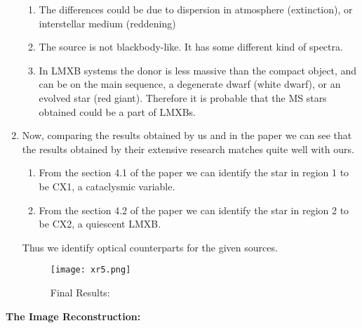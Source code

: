 \documentclass{article}
\begin{document}
\begin{enumerate}
\begin{enumerate}
        \item The differences could be due to dispersion in atmosphere (extinction), or interstellar medium (reddening)
        \item The source is not blackbody-like. It has some different kind of spectra.
        \item In LMXB systems the donor is less massive than the compact object, and can be on the main sequence, a degenerate dwarf (white dwarf), or an evolved star (red giant).\newline
        Therefore it is probable that the MS stars obtained could be a part of LMXBs.\newline
        \end{enumerate}
        \item Now, comparing the results obtained by us and in the paper \parencite{Zhao_2018} we can see that the results obtained by their extensive research matches quite well with ours. 
        \begin{enumerate}
            \item From the section 4.1 of the paper we can identify the star in region 1 to be CX1, a cataclysmic variable.
            \item From the section 4.2 of the paper we can identify the star in region 2 to be CX2, a quiescent LMXB.
        \end{enumerate}
        Thus we identify optical counterparts for the given sources.
        \begin{figure}[H]
        \caption{Final Results:}
        \centering
        \texttt{[image: xr5.png]}
        \end{figure}
\end{enumerate}\newpage
\textbf{\Large The Image Reconstruction: }\newline
\end{document}
